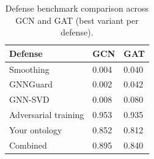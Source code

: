 \begin{table}[t]
\centering
\small
\begin{tabular}{lll}
\toprule
Defense & GCN & GAT \\
\midrule
Smoothing & 0.004 & 0.040 \\
GNNGuard & 0.002 & 0.042 \\
GNN-SVD & 0.008 & 0.080 \\
Adversarial training & 0.953 & 0.935 \\
Your ontology & 0.852 & 0.812 \\
Combined & 0.895 & 0.840 \\
\bottomrule
\end{tabular}

\caption{Defense benchmark comparison across GCN and GAT (best variant per defense).}
\label{tab:defense_benchmark}
\end{table}
